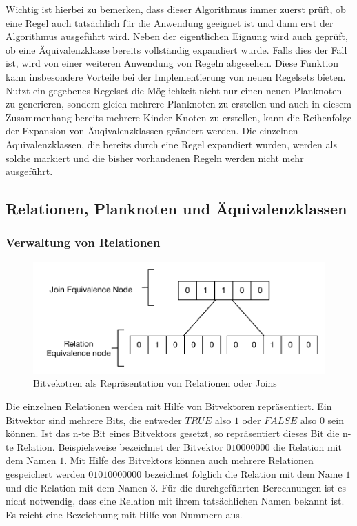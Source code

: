 Wichtig ist hierbei zu bemerken, dass dieser Algorithmus immer zuerst prüft, ob eine Regel auch tatsächlich für die Anwendung geeignet ist und dann erst der Algorithmus ausgeführt wird. Neben der eigentlichen Eignung wird auch geprüft, ob eine Äquivalenzklasse bereits vollständig expandiert wurde. Falls dies der Fall ist, wird von einer weiteren Anwendung von Regeln abgesehen. Diese Funktion kann insbesondere Vorteile bei der Implementierung von neuen Regelsets bieten. Nutzt ein gegebenes Regelset die Möglichkeit nicht nur einen neuen Planknoten zu generieren, sondern gleich mehrere Planknoten zu erstellen und auch in diesem Zusammenhang bereits mehrere Kinder-Knoten zu erstellen, kann die Reihenfolge der Expansion von Äuqivalenzklassen geändert werden. Die einzelnen Äquivalenzklassen, die bereits durch eine Regel expandiert wurden, werden als solche markiert und die bisher vorhandenen Regeln werden nicht mehr ausgeführt.




\subsection{Relationen, Planknoten und Äquivalenzklassen}

\subsubsection{Verwaltung von Relationen}
\label{sec:Bitvector}


\begin{figure}[ht]
  \centering
  \includegraphics{04_Implementierung/Bitvector.pdf}
  \caption{Bitvekotren als Repräsentation von Relationen oder Joins}
  \label{Bitvektor}
\end{figure}

Die einzelnen Relationen werden mit Hilfe von Bitvektoren repräsentiert. Ein Bitvektor sind mehrere Bits, die entweder $TRUE$ also $1$ oder $FALSE$ also $0$ sein können. Ist das n-te Bit eines Bitvektors gesetzt, so repräsentiert dieses Bit die n-te Relation. Beispielsweise bezeichnet der Bitvektor $010000000$ die Relation mit dem Namen $1$. Mit Hilfe des Bitvektors können auch mehrere Relationen gespeichert werden $01010000000$ bezeichnet folglich die Relation mit dem Name $1$ und die Relation mit dem Namen $3$. Für die durchgeführten Berechnungen ist es nicht notwendig, dass eine Relation mit ihrem tatsächlichen Namen bekannt ist. Es reicht eine Bezeichnung mit Hilfe von Nummern aus.

